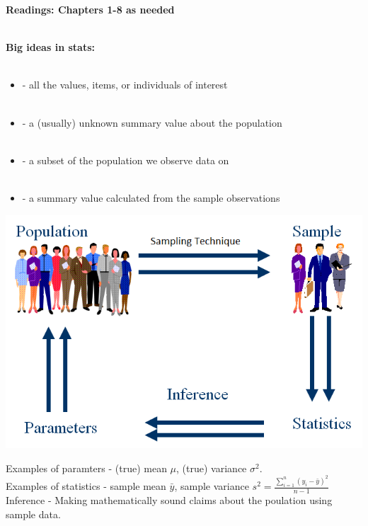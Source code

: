 \begin{center}\large\textbf{Readings: Chapters 1-8 as needed}\\
\normalsize \end{center}
\large \hlinewd{2pt}
~\\\noindent \textbf{Big ideas in stats:}\normalsize\\~\\
\begin{itemize}
\item {} - all the values, items, or individuals of interest\\~\\

\item {}  - a (usually) unknown summary value about the population\\~\\

\item {} - a subset of the population we observe data on\\~\\

\item {} - a summary value calculated from the sample observations
\end{itemize}

\begin{center}
\includegraphics[scale=0.4]{paradigm}
\end{center}
Examples of paramters - (true) mean $\mu$, (true) variance $\sigma^2$.\\
Examples of statistics - sample mean $\bar{y}$, sample variance $s^2=\frac{\sum_{i=1}^{n}(y_i-\bar{y})^2}{n-1}$\\
Inference - Making mathematically sound claims about the poulation using sample data.

